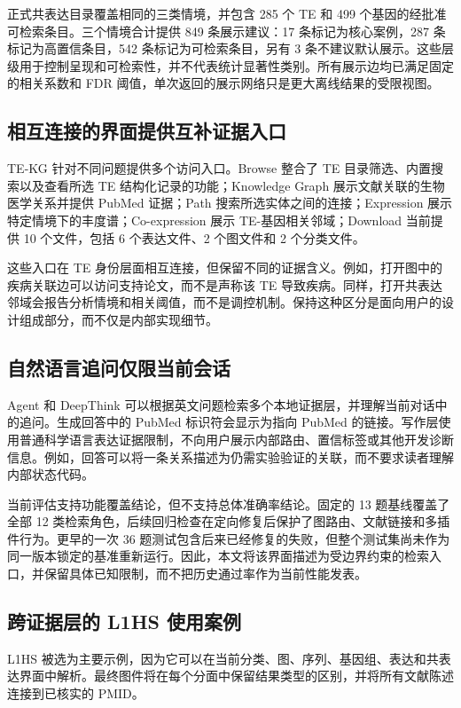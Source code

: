 正式共表达目录覆盖相同的三类情境，并包含 285 个 TE 和 499 个基因的经批准可检索条目。三个情境合计提供 849 条展示建议：17 条标记为核心案例，287 条标记为高置信条目，542 条标记为可检索条目，另有 3 条不建议默认展示。这些层级用于控制呈现和可检索性，并不代表统计显著性类别。所有展示边均已满足固定的相关系数和 FDR 阈值，单次返回的展示网络只是更大离线结果的受限视图。

\subsection{相互连接的界面提供互补证据入口}

TE-KG 针对不同问题提供多个访问入口。Browse 整合了 TE 目录筛选、内置搜索以及查看所选 TE 结构化记录的功能；Knowledge Graph 展示文献关联的生物医学关系并提供 PubMed 证据；Path 搜索所选实体之间的连接；Expression 展示特定情境下的丰度谱；Co-expression 展示 TE-基因相关邻域；Download 当前提供 10 个文件，包括 6 个表达文件、2 个图文件和 2 个分类文件。

这些入口在 TE 身份层面相互连接，但保留不同的证据含义。例如，打开图中的疾病关联边可以访问支持论文，而不是声称该 TE 导致疾病。同样，打开共表达邻域会报告分析情境和相关阈值，而不是调控机制。保持这种区分是面向用户的设计组成部分，而不仅是内部实现细节。

\subsection{自然语言追问仅限当前会话}

Agent 和 DeepThink 可以根据英文问题检索多个本地证据层，并理解当前对话中的追问。生成回答中的 PubMed 标识符会显示为指向 PubMed 的链接。写作层使用普通科学语言表达证据限制，不向用户展示内部路由、置信标签或其他开发诊断信息。例如，回答可以将一条关系描述为仍需实验验证的关联，而不要求读者理解内部状态代码。

当前评估支持功能覆盖结论，但不支持总体准确率结论。固定的 13 题基线覆盖了全部 12 类检索角色，后续回归检查在定向修复后保护了图路由、文献链接和多插件行为。更早的一次 36 题测试包含后来已经修复的失败，但整个测试集尚未作为同一版本锁定的基准重新运行。因此，本文将该界面描述为受边界约束的检索入口，并保留具体已知限制，而不把历史通过率作为当前性能发表。

\subsection{跨证据层的 L1HS 使用案例}

L1HS 被选为主要示例，因为它可以在当前分类、图、序列、基因组、表达和共表达界面中解析。最终图件将在每个分面中保留结果类型的区别，并将所有文献陈述连接到已核实的 PMID。
